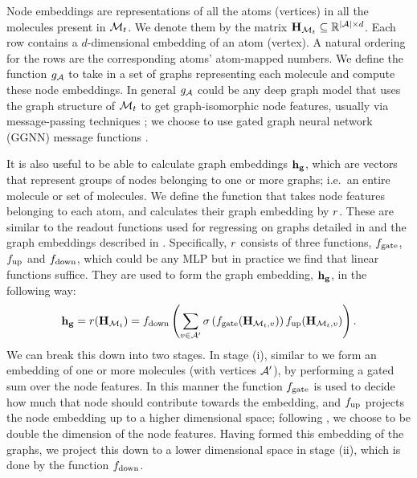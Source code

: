 Node embeddings are representations of all the atoms (vertices) in all the molecules present in ${\mathcal{M}}_t$.
 We denote them by the matrix ${\mathbf{H}}_{{\mathcal{M}}_t} \subseteq \mathbb{R}^{|{\mathcal{A}}|\times d}$.
Each row contains a $d$-dimensional embedding of an atom (vertex).
A natural ordering for the rows are  the corresponding atoms' atom-mapped numbers.
We define the function $g_{{\mathcal{A}}}$ to take in a set of graphs representing each molecule and compute these node embeddings.
In general $g_{{\mathcal{A}}}$ could be any deep graph model that uses the graph structure of ${\mathcal{M}}_t$ to get graph-isomorphic node features, usually via message-passing techniques \citep{gilmer2017neural};
we choose to use gated graph neural network (GGNN) message functions \citep{li2016gated}.

It is also useful to be able to calculate graph embeddings $\mathbf{h_g}$, which are vectors that represent groups of nodes belonging to one or more graphs; i.e.\ an entire molecule or set of molecules.
 We define the function that takes node features belonging to each atom, and calculates their graph embedding by $r$.
These are similar to the readout functions used for regressing on graphs detailed in \citep[Eq. 3]{gilmer2017neural} and the graph embeddings described in \citet[\S B.1]{li2018learning}. 
Specifically, $r$ consists of three functions, $f_\textrm{gate}$, $f_\textrm{up}$ and $f_\textrm{down}$, which could be any MLP but in practice we find that linear functions suffice. %
They are used to form the graph embedding, $\mathbf{h_g}$, in the following way:
\begin{align}
	\mathbf{h_g} = r({\mathbf{H}}_{{\mathcal{M}}_t}) = f_\textrm{down}\left(\sum_{v \in {\mathcal{A}}'} \sigma\left(f_\textrm{gate}({\mathbf{H}}_{{\mathcal{M}}_t,v})\right) f_\textrm{up}({\mathbf{H}}_{{\mathcal{M}}_t, v})\right).
	\label{eq:graph-embedding}
\end{align}
We can break this down into two stages.
In stage (i), similar to \citet[\S B.1]{li2018learning} we form an embedding of one or more molecules (with vertices ${\mathcal{A}}'$), by performing a gated sum over the node features.
In this manner the function $f_\textrm{gate}$ is used to decide how much that node should contribute towards the embedding,
 and $f_\textrm{up}$ projects the node embedding up to a higher dimensional space; following \citet[\S B.1]{li2018learning}, we choose to be double the dimension of the node features.
Having formed this embedding of the graphs, we project this down to a lower dimensional space in stage (ii), which is done by the function $f_\textrm{down}$. 


